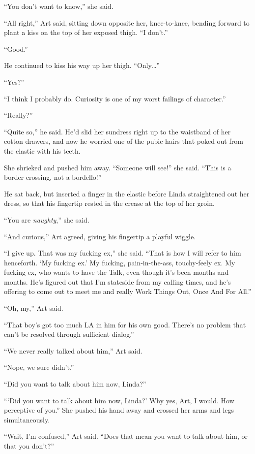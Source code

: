 “You don’t want to know,” she said.

“All right,” Art said, sitting down opposite her, knee-to-knee,
bending forward to plant a kiss on the top of her exposed thigh. “I
don’t.”

“Good.”

He continued to kiss his way up her thigh. “Only\ldots{}”

“Yes?”

“I think I probably do. Curiosity is one of my worst failings of
character.”

“Really?”

“Quite so,” he said. He’d slid her sundress right up to the
waistband of her cotton drawers, and now he worried one of the
pubic hairs that poked out from the elastic with his teeth.

She shrieked and pushed him away. “Someone will see!” she said.
“This is a border crossing, not a bordello!”

He sat back, but inserted a finger in the elastic before Linda
straightened out her dress, so that his fingertip rested in the
crease at the top of her groin.

“You are \emph{naughty},” she said.

“And curious,” Art agreed, giving his fingertip a playful wiggle.

“I give up. That was my fucking ex,” she said. “That is how I will
refer to him henceforth. ‘My fucking ex.’ My fucking,
pain-in-the-ass, touchy-feely ex. My fucking ex, who wants to have
the Talk, even though it’s been months and months. He’s figured out
that I’m stateside from my calling times, and he’s offering to come
out to meet me and really Work Things Out, Once And For All.”

“Oh, my,” Art said.

“That boy’s got too much LA in him for his own good. There’s no
problem that can’t be resolved through sufficient dialog.”

“We never really talked about him,” Art said.

“Nope, we sure didn’t.”

“Did you want to talk about him now, Linda?”

“‘Did you want to talk about him now, Linda?’ Why yes, Art, I
would. How perceptive of you.” She pushed his hand away and crossed
her arms and legs simultaneously.

“Wait, I’m confused,” Art said. “Does that mean you want to talk
about him, or that you don’t?”

